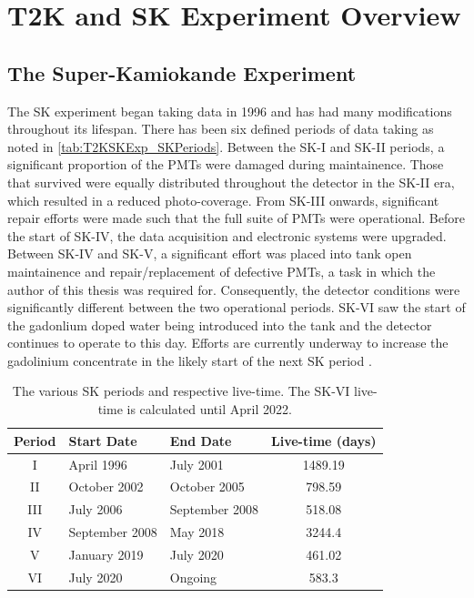 \chapter{T2K and SK Experiment Overview}
\label{chap:T2KSKExp}

\section{The Super-Kamiokande Experiment}
\label{sec:T2KSKExp_SK}

The SK experiment began taking data in 1996 \cite{Fukuda1998-tw} and has had many modifications throughout its lifespan. There has been six defined periods of data taking as noted in \autoref{tab:T2KSKExp_SKPeriods}. Between the SK-I and SK-II periods, a significant proportion of the PMTs were damaged during maintainence. Those that survived were equally distributed throughout the detector in the SK-II era, which resulted in a reduced photo-coverage. From SK-III onwards, significant repair efforts were made such that the full suite of PMTs were operational. Before the start of SK-IV, the data acquisition and electronic systems were upgraded. Between SK-IV and SK-V, a significant effort was placed into tank open maintainence and repair/replacement of defective PMTs, a task in which the author of this thesis was required for. Consequently, the detector conditions were significantly different between the two operational periods. SK-VI saw the start of the  gadonlium doped water being introduced into the tank and the detector continues to operate to this day. Efforts are currently underway to increase the gadolinium concentrate in the likely start of the next SK period .

\begin{table}[ht!]
    \centering
    \begin{tabular}{c|l|l|c}
      \hline
      Period & Start Date & End Date & Live-time (days) \\
      \hline
      I & April 1996 & July 2001 & 1489.19 \\
      II & October 2002 & October 2005 & 798.59 \\
      III & July 2006 & September 2008 & 518.08 \\
      IV & September 2008 & May 2018 & 3244.4 \\
      V & January 2019 & July 2020 & 461.02 \\
      VI & July 2020 & Ongoing & 583.3 \\
      \hline 
      \hline
    \end{tabular}
    \caption{The various SK periods and respective live-time. The SK-VI live-time is calculated until  April 2022.}
    \label{tab:T2KSKExp_SKPeriods}
\end{table}

